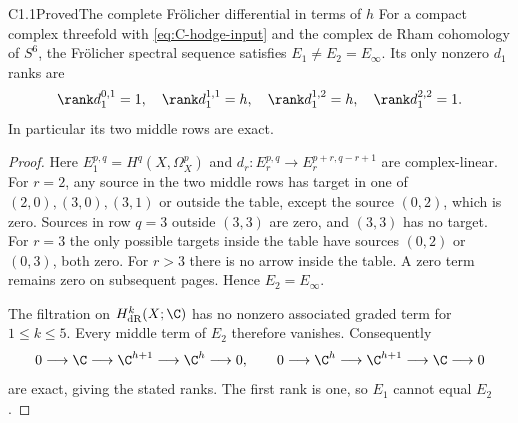 \begin{claim}{C1.1}{Proved}{The complete Fr\"olicher differential in terms of $h$}
For a compact complex threefold with \eqref{eq:C-hodge-input} and the
complex de Rham cohomology of $S^6$, the Fr\"olicher spectral sequence
satisfies $E_1\ne E_2=E_\infty$.  Its only nonzero $d_1$ ranks are
\[
\rank d_1^{0,1}=1,\quad \rank d_1^{1,1}=h,\quad
\rank d_1^{1,2}=h,\quad \rank d_1^{2,2}=1.
\]
In particular its two middle rows are exact.
\end{claim}
\begin{proof}
Here $E_1^{p,q}=H^q(X,\Omega_X^p)$ and
$d_r:E_r^{p,q}\longrightarrow E_r^{p+r,q-r+1}$ are complex-linear.
For $r=2$, any source in the two middle rows has target in one of
$(2,0),(3,0),(3,1)$ or outside the table, except the source $(0,2)$,
which is zero.  Sources in row $q=3$ outside $(3,3)$ are zero, and
$(3,3)$ has no target.  For $r=3$ the only possible targets inside the
table have sources $(0,2)$ or $(0,3)$, both zero.  For $r>3$ there is
no arrow inside the table.  A zero term remains zero on subsequent
pages.  Hence $E_2=E_\infty$.

The filtration on $H^k_{\mathrm{dR}}(X;\C)$ has no nonzero associated
graded term for $1\le k\le5$.  Every middle term of $E_2$ therefore
vanishes.  Consequently
\[
0\longrightarrow\C\longrightarrow\C^{h+1}
\longrightarrow\C^h\longrightarrow0,
\qquad
0\longrightarrow\C^h\longrightarrow\C^{h+1}
\longrightarrow\C\longrightarrow0
\]
are exact, giving the stated ranks.  The first rank is one, so $E_1$
cannot equal $E_2$.
\end{proof}
